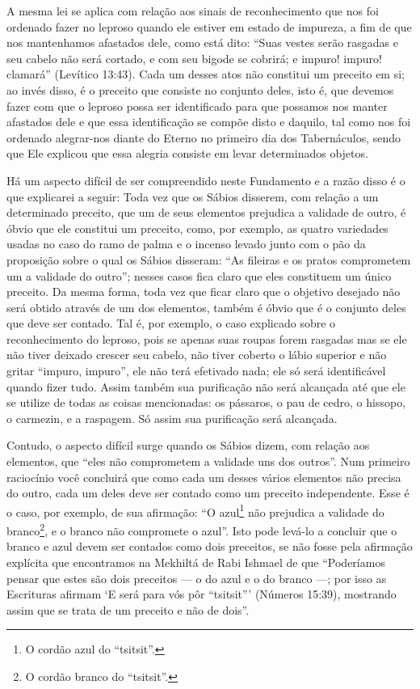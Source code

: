 A mesma lei se aplica com relação aos sinais de reconhecimento que nos
foi ordenado fazer no leproso quando ele estiver em estado de impureza,
a fim de que nos mantenhamos afastados dele, como está dito: ``Suas
vestes serão rasgadas e seu cabelo não será cortado, e com seu bigode se
cobrirá; e impuro! impuro! clamará'' (Levítico 13:43). Cada um desses
atos não constitui um preceito em si; ao invés disso, é o preceito que
consiste no conjunto deles,
isto é, que devemos fazer com que o leproso possa ser identificado para
que possamos nos manter afastados dele e que essa identificação se
compõe disto e daquilo, tal como nos foi ordenado alegrar-nos diante do
Eterno no primeiro dia dos Tabernáculos, sendo que Ele explicou que essa
alegria consiste em levar determinados objetos.

Há um aspecto difícil de ser compreendido neste Fundamento e a razão
disso é o que explicarei a seguir: Toda vez que os Sábios disserem, com
relação a um determinado preceito, que um de seus elementos prejudica a
validade de outro, é óbvio que ele constitui um preceito, como, por
exemplo, as quatro variedades usadas no caso do ramo de palma e o
incenso levado junto com o pão da proposição sobre o qual os Sábios
disseram: ``As fileiras e os pratos comprometem um a validade do
outro''; nesses casos fica claro que eles constituem um único preceito.
Da mesma forma, toda vez que ficar claro que o objetivo desejado não
será obtido através de um dos elementos, também é óbvio que é o conjunto
deles que deve ser contado. Tal é, por exemplo, o caso explicado sobre o
reconhecimento do leproso, pois se apenas suas roupas forem rasgadas
mas se ele não tiver deixado crescer seu cabelo, não tiver coberto o
lábio superior e não gritar ``impuro, impuro'', ele não terá efetivado
nada; ele só será identificável quando fizer tudo. Assim também sua
purificação não será alcançada até que ele se utilize de todas as coisas
mencionadas: os pássaros, o pau de cedro, o hissopo, o carmezin, e a
raspagem. Só assim sua purificação será alcançada.

Contudo, o aspecto difícil surge quando os Sábios dizem, com relação
aos elementos, que ``eles não comprometem a validade uns dos outros''.
Num primeiro raciocínio você concluirá que como cada um desses vários
elementos não precisa do outro, cada um deles deve ser contado como um
preceito independente. Esse é o caso, por exemplo, de sua afirmação:
``O azul\footnote{O cordão azul do ``tsitsit''.} não prejudica a validade do
branco\footnote{O cordão branco do ``tsitsit''.}, e o branco não compromete o azul''. Isto
pode levá-lo a concluir que o branco e azul devem ser contados como dois
preceitos, se não fosse pela afirmação explícita que encontramos na
Mekhiltá de Rabi Ishmael de que ``Poderíamos pensar que estes são dois
preceitos --- o do azul e o do branco ---; por isso as Escrituras
afirmam `E será para vós pôr ``tsitsit''' (Números 15:39), mostrando
assim que se trata de um preceito e não de dois''.

